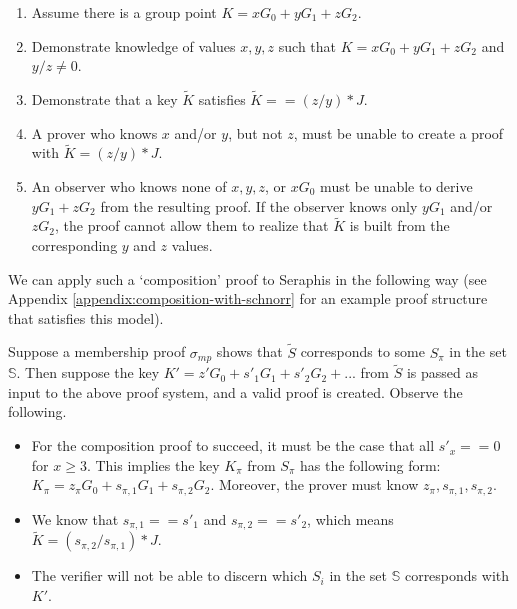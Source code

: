 \begin{enumerate}
    \item Assume there is a group point $K = x G_0 + y G_1 + z G_2$.

    \item Demonstrate knowledge of values $x, y, z$ such that $K = x G_0 + y G_1 + z G_2$ and $y/z \neq 0$.

    \item Demonstrate that a key $\tilde{K}$ satisfies $\tilde{K} == (z/y)*J$.

    \item A prover who knows $x$ and/or $y$, but not $z$, must be unable to create a proof with $\tilde{K} = (z/y)*J$.

    \item An observer who knows none of $x, y, z$, or $x G_0$ must be unable to derive $y G_1 + z G_2$ from the resulting proof. If the observer knows only $y G_1$ and/or $z G_2$, the proof cannot allow them to realize that $\tilde{K}$ is built from the corresponding $y$ and $z$ values.
\end{enumerate}

We can apply such a `composition' proof to Seraphis in the following way (see Appendix \ref{appendix:composition-with-schnorr} for an example proof structure that satisfies this model).

Suppose a membership proof $\sigma_{mp}$ shows that $\tilde{S}$ corresponds to some $S_{\pi}$ in the set $\mathbb{S}$. Then suppose the key $K' = z' G_0 + s'_1 G_1 + s'_2 G_2 + ...$ from $\tilde{S}$ is passed as input to the above proof system, and a valid proof is created. Observe the following.

\begin{itemize}
    \item For the composition proof to succeed, it must be the case that all $s'_x == 0$ for $x \geq 3$. This implies the key $K_{\pi}$ from $S_{\pi}$ has the following form: $K_{\pi} = z_{\pi} G_0 + s_{\pi, 1} G_1 + s_{\pi, 2} G_2$. Moreover, the prover must know $z_{\pi}, s_{\pi, 1}, s_{\pi, 2}$.

    \item We know that $s_{\pi, 1} == s'_1$ and $s_{\pi, 2} == s'_2$, which means $\tilde{K} = (s_{\pi, 2}/ s_{\pi, 1})*J$.

    \item The verifier will not be able to discern which $S_i$ in the set $\mathbb{S}$ corresponds with $K'$.
\end{itemize}

